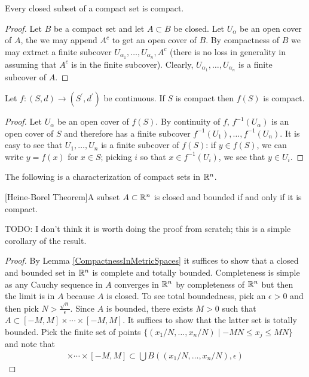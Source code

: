 \begin{cor}\label{ClosedSubsetsCompact}Every closed subset of a compact set is compact.
\end{cor} 
\begin{proof}Let $B$ be a compact set and let $A \subset B$ be
  closed.  Let $U_\alpha$ be an open cover of $A$, the we may append
  $A^c$ to get an open cover of $B$.  By compactness of $B$ we may
  extract a finite subcover $U_{\alpha_1}, \dotsc, U_{\alpha_n}, A^c$
  (there is no loss in generality in assuming that $A^c$ is in the
  finite subcover).  Clearly, $U_{\alpha_1}, \dotsc, U_{\alpha_n}$ is
  a finite subcover of $A$.
\end{proof}

\begin{thm}\label{ContinuousImageOfCompact}Let $f : (S, d) \to
  (S^\prime, d^\prime)$ be continuous.  If $S$ is compact then $f(S)$
  is compact.
\end{thm}
\begin{proof}Let $U_\alpha$ be an open cover of $f(S)$.  By continuity
  of $f$, $f^{-1}(U_\alpha)$ is an open cover of $S$ and therefore has
  a finite subcover $f^{-1}(U_1), \dots, f^{-1}(U_n)$.  It is easy to
  see that $U_1, \dots, U_n$ is a finite subcover of $f(S)$:  if $y \in
  f(S)$, we can write $y = f(x)$ for $x \in S$; picking $i$ so that $x \in
  f^{-1}(U_i)$, we see that $y \in U_i$.
\end{proof}

The following is a characterization of compact sets in $\mathbb{R}^n$.
\begin{thm}\label{HeineBorel}[Heine-Borel Theorem]A subset $A \subset
  \mathbb{R}^n$ is closed and
  bounded if and only if it is compact.
\end{thm}
TODO:  I don't think it is worth doing the proof from scratch; this is
a simple corollary of the result.
\begin{proof}By Lemma \ref{CompactnessInMetricSpaces} it suffices to
  show that a closed and bounded set in $\mathbb{R}^n$ is complete and
  totally bounded.  Completeness is simple as any Cauchy sequence in
  $A$ converges in $\mathbb{R}^n$ by completeness of $\mathbb{R}^n$ but then
  the limit is in $A$ because $A$ is closed.  To see total
  boundedness, pick an $\epsilon > 0$ and then pick $N >
  \frac{\sqrt{n}}{\epsilon}$.  Since $A$ is bounded, there exists $M >
  0$ such that $A \subset [-M, M] \times \cdots \times [-M,M]$.  It
  suffices to show that the latter set is totally bounded.  Pick
  the finite set of points $\lbrace (x_1/N, \dots , x_n/N) \mid -MN \leq x_j
    \leq MN \rbrace$ and note that 
\begin{align*} [-M, M] \times \cdots \times
  [-M,M] \subset \bigcup B((x_1/N, \dots , x_n/N), \epsilon)
\end{align*}
\end{proof}

